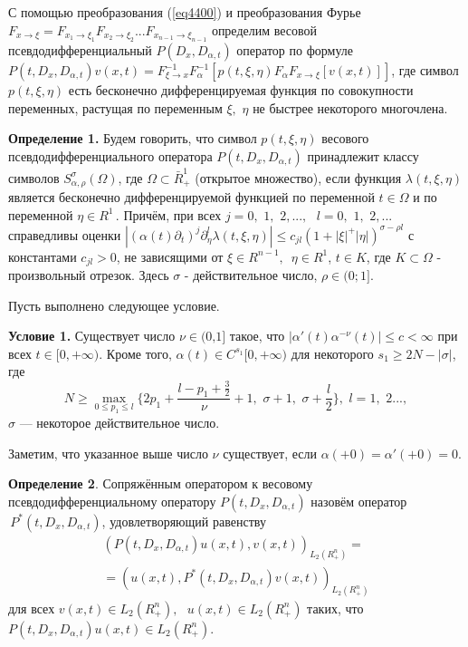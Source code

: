 {С помощью преобразования (\ref{eq4400}) и преобразования Фурье $F_{x \to \xi } = F_{x_1
\to \xi _1 } F_{x_2 \to \xi _2 } ...F_{x_{n - 1} \to \xi _{n - 1} } $
определим весовой псевдодифференциальный $P(D_x ,D_{\alpha ,t} )$ оператор
по формуле $P(t,D_x ,D_{\alpha ,t} )v(x,t) = F_{\xi \to x}^{ - 1} F_\alpha
^{ - 1} [p(t,\xi ,\eta )F_\alpha F_{x \to \xi } [v(x,t)]]$,
где символ $p(t,\xi ,\eta )$ есть бесконечно дифференцируемая функция по
совокупности переменных, растущая по переменным $\xi ,\,\,\eta $ не быстрее
некоторого многочлена.

\textbf{Определение 1.} Будем говорить, что символ $p(t,\xi ,\eta )$
весового псевдодифференциального оператора $P(t,D_x ,D_{\alpha ,t} )$
принадлежит классу символов $S_{\alpha ,\rho }^\sigma (\Omega )$, где
$\Omega \subset \bar {R}_ + ^1 $ (открытое множество), если функция $\lambda
(t,\xi ,\eta )$ является бесконечно дифференцируемой функцией по переменной
$t \in \Omega $ и по переменной $\eta \in R^1\,$. Причём, при всех $j =
0,\,\,1,\,\,2,...,\,\,\,\,l = 0,\,\,1,\,\,2,...$ справедливы оценки $\left|
{(\alpha (t)\partial _t )^j\partial _\eta ^l \lambda (t,\xi ,\eta )} \right|
\le c_{jl} (1 + \left| \xi \right|^ + \left| \eta \right|)^{\sigma - \rho
l}$ с константами $c_{jl} > 0$, не зависящими от $\xi \in R^{n -
1},\,\,\,\eta \in R^1$, $t \in K$, где $K \subset \Omega $ - произвольный
отрезок. Здесь $\sigma $ - действительное число, $\rho \in (0;1]$.

Пусть выполнено следующее условие.

\textbf{Условие 1.} Существует число $\nu \in \mbox{(0,1]}$ такое, что
$\left| {\alpha '(t)\alpha ^{ - \nu }(t)} \right| \le c < \infty $ при всех
$t \in [0, + \infty )$. Кроме того, $\alpha (t) \in C^{s_1 }[0, + \infty )$
для некоторого $s_1 \ge 2N - \left| \sigma \right|$, где
\[
N \ge \mathop {\max }\limits_{0 \le p_1 \le l} \{2p_1 + \frac{l - p_1 +
\frac{3}{2}}{\nu } + 1,\,\,\sigma + 1,\,\,\sigma + \frac{l}{2}\},\,\,l =
1,\,\,2...,
\]
$\sigma$ --- некоторое действительное число.



Заметим, что указанное выше число $\nu $ существует, если $\alpha ( + 0) =
\alpha '( + 0) = 0$.

\textbf{Определение 2}. Сопряжённым оператором к весовому
псевдодифференциальному оператору $P(t,D_x ,D_{\alpha ,t} )$ назовём
оператор $\,P^\ast (t,D_x ,D_{\alpha ,t} )$, удовлетворяющий равенству
\begin{multline*}
(P(t,D_x ,D_{\alpha ,t} )u(x,t),v(x,t))_{L_2 (R_ + ^n )} =
\\=
(u(x,t),P^\ast
(t,D_x ,D_{\alpha ,t} )v(x,t))_{L_2 (R_ + ^n )}
\end{multline*}
для всех $v(x,t) \in L_2 (R_ + ^n ),\,\,\,\,u(x,t) \in L_2 (R_ + ^n )$
таких, что $P(t,D_x ,D_{\alpha ,t} )u(x,t) \in L_2 (R_ + ^n )$.

}

